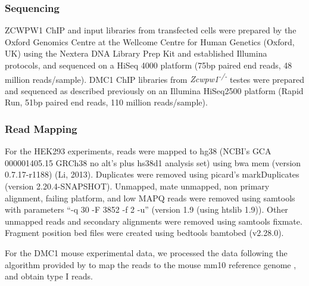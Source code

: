 \subsubsection{Sequencing}
ZCWPW1 ChIP and input libraries from transfected cells were prepared by the Oxford Genomics Centre at the Wellcome Centre for Human Genetics (Oxford, UK) using the Nextera DNA Library Prep Kit and established Illumina protocols, and sequenced on a HiSeq 4000 platform (75bp paired end reads, 48 million reads/sample).
DMC1 ChIP libraries from \textit{Zcwpw1\textsuperscript{-/-}} testes were prepared and sequenced as described previously \parencite{Davies2016Reengineering} on an Illumina HiSeq2500 platform (Rapid Run, 51bp paired end reads, 110 million reads/sample).

\subsubsection{Read Mapping}
For the HEK293 experiments, reads were mapped to hg38 (NCBI’s GCA 000001405.15 GRCh38 no alt's plus hs38d1 analysis set) using bwa mem (version 0.7.17-r1188) (Li, 2013).
Duplicates were removed using picard’s markDuplicates (version 2.20.4-SNAPSHOT).
Unmapped, mate unmapped, non primary alignment, failing platform, and low MAPQ reads were removed using samtools with parameters “-q 30 -F 3852 -f 2 -u” (version 1.9 (using htslib 1.9)).
Other unmapped reads and secondary alignments were removed using samtools fixmate.
Fragment position bed files were created using bedtools bamtobed (v2.28.0).

For the DMC1 mouse experimental data, we processed the data following the algorithm provided by \parencite{Khil2012Sensitive} to map the reads to the mouse mm10 reference genome \parencite{Lunter2011Stampy}, and obtain type I reads.

